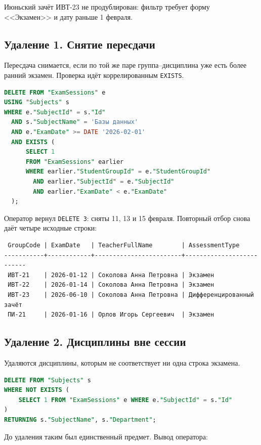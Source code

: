 \documentclass[12pt,a4paper]{article}
\begin{document}
Июньский зачёт ИВТ-23 не продублирован: фильтр требует форму <<Экзамен>> и дату раньше 1 февраля.

\subsection*{Удаление 1. Снятие пересдачи}
Пересдача снимается, если по той же паре группа--дисциплина уже есть более ранний экзамен. Проверка идёт коррелированным \texttt{EXISTS}.

\begin{lstlisting}[language=SQL]
DELETE FROM "ExamSessions" e
USING "Subjects" s
WHERE e."SubjectId" = s."Id"
  AND s."SubjectName" = 'Базы данных'
  AND e."ExamDate" >= DATE '2026-02-01'
  AND EXISTS (
      SELECT 1
      FROM "ExamSessions" earlier
      WHERE earlier."StudentGroupId" = e."StudentGroupId"
        AND earlier."SubjectId" = e."SubjectId"
        AND earlier."ExamDate" < e."ExamDate"
  );
\end{lstlisting}

Оператор вернул \texttt{DELETE 3}: сняты 11, 13 и 15 февраля. Повторный отбор снова даёт четыре исходные строки:

\begin{lstlisting}
 GroupCode | ExamDate   | TeacherFullName        | AssessmentType
-----------+------------+------------------------+--------------------------
 ИВТ-21    | 2026-01-12 | Соколова Анна Петровна | Экзамен
 ИВТ-22    | 2026-01-14 | Соколова Анна Петровна | Экзамен
 ИВТ-23    | 2026-06-10 | Соколова Анна Петровна | Дифференцированный зачёт
 ПИ-21     | 2026-01-16 | Орлов Игорь Сергеевич  | Экзамен
\end{lstlisting}

\subsection*{Удаление 2. Дисциплины вне сессии}
Удаляются дисциплины, которым не соответствует ни одна строка экзамена.

\begin{lstlisting}[language=SQL]
DELETE FROM "Subjects" s
WHERE NOT EXISTS (
    SELECT 1 FROM "ExamSessions" e WHERE e."SubjectId" = s."Id"
)
RETURNING s."SubjectName", s."Department";
\end{lstlisting}

До удаления таким был единственный предмет. Вывод оператора:
\end{document}
